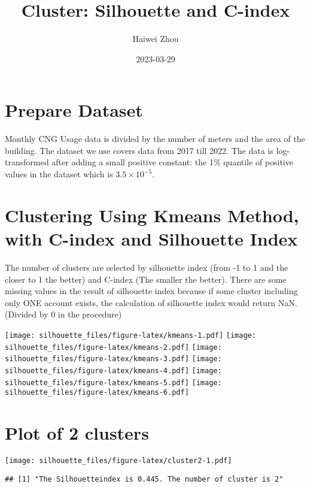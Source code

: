 \documentclass[
]{article}
\title{Cluster: Silhouette and C-index}
\author{Haiwei Zhou}
\date{2023-03-29}
\begin{document}
\maketitle

\hypertarget{prepare-dataset}{%
\section{Prepare Dataset}\label{prepare-dataset}}

Monthly CNG Usage data is divided by the number of meters and the area
of the building. The dataset we use covers data from 2017 till 2022. The
data is log-transformed after adding a small positive constant: the 1\%
quantile of positive values in the dataset which is
\(3.5\times10^{-5}\).

\hypertarget{clustering-using-kmeans-method-with-c-index-and-silhouette-index}{%
\section{Clustering Using Kmeans Method, with C-index and Silhouette
Index}\label{clustering-using-kmeans-method-with-c-index-and-silhouette-index}}

The number of clusters are selected by silhouette index (from -1 to 1
and the closer to 1 the better) and C-index (The smaller the better).
There are some missing values in the result of silhouette index because
if some cluster including only ONE account exists, the calculation of
silhouette index would return NaN. (Divided by 0 in the procedure)

\texttt{[image: silhouette\_files/figure-latex/kmeans-1.pdf]}
\texttt{[image: silhouette\_files/figure-latex/kmeans-2.pdf]}
\texttt{[image: silhouette\_files/figure-latex/kmeans-3.pdf]}
\texttt{[image: silhouette\_files/figure-latex/kmeans-4.pdf]}
\texttt{[image: silhouette\_files/figure-latex/kmeans-5.pdf]}
\texttt{[image: silhouette\_files/figure-latex/kmeans-6.pdf]}

\newpage

\hypertarget{plot-of-2-clusters}{%
\section{Plot of 2 clusters}\label{plot-of-2-clusters}}

\texttt{[image: silhouette\_files/figure-latex/cluster2-1.pdf]}

\begin{verbatim}
## [1] "The Silhouetteindex is 0.445. The number of cluster is 2"
\end{verbatim}
\end{document}
